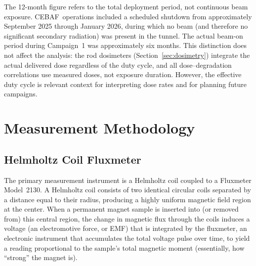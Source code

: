 \documentclass[11pt,letterpaper]{article}
\newcommand{\CEBAF}{CEBAF}
\begin{document}
The 12-month figure refers to the total deployment period, not continuous
beam exposure. \CEBAF~operations included a scheduled shutdown from
approximately September 2025 through January 2026, during which no beam
(and therefore no significant secondary radiation) was present in the
tunnel. The actual beam-on period during Campaign~1 was approximately
six months. This distinction does not affect the analysis: the rod
dosimeters (Section~\ref{sec:dosimetry}) integrate the actual delivered
dose regardless of the duty cycle, and all dose--degradation correlations
use measured doses, not exposure duration. However, the effective duty
cycle is relevant context for interpreting dose rates and for planning
future campaigns.

\section{Measurement Methodology}
\label{sec:measurement}

\subsection{Helmholtz Coil Fluxmeter}

The primary measurement instrument is a Helmholtz coil coupled to a Fluxmeter
Model~2130. A Helmholtz coil consists of two identical circular coils separated
by a distance equal to their radius, producing a highly uniform magnetic field
region at the center. When a permanent magnet sample is inserted into (or
removed from) this central region, the change in magnetic flux through the
coils induces a voltage (an electromotive force, or EMF) that is integrated by
the fluxmeter, an electronic instrument that accumulates the total voltage
pulse over time, to yield a reading proportional to the sample's total
magnetic moment (essentially, how ``strong'' the magnet is).
\end{document}

